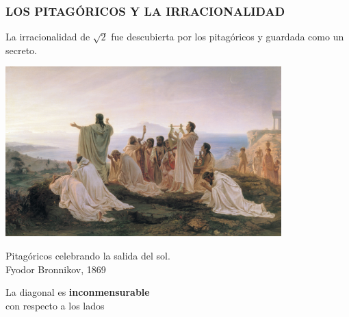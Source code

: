 \begin{frame}
  \frametitle{LOS PITAGÓRICOS Y LA IRRACIONALIDAD}

  La irracionalidad de $\sqrt{2}$ fue descubierta por los pitagóricos y guardada
  como un secreto.

  \begin{center}
    \includegraphics[width=0.8\textwidth]{pitagoricos.jpg}

    Pitagóricos celebrando la salida del sol. \\
    Fyodor Bronnikov, 1869
  \end{center}
\end{frame}

\begin{frame}
  \begin{center}

    \vspace{1em}

    La diagonal es \textbf{inconmensurable}\\
    con respecto a los lados
  \end{center}
\end{frame}

